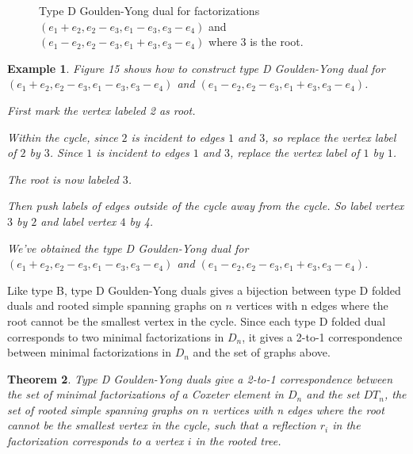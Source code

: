 \documentclass[11pt]{amsart}
\newtheorem{thm}{Theorem}[section]
\newtheorem{exa}[thm]{Example}%
\begin{document}
\begin{figure}
\caption{Type D Goulden-Yong dual for factorizations $(e_1+e_2,e_2-e_3,e_1-e_3,e_3-e_4)$ and $(e_1-e_2,e_2-e_3,e_1+e_3,e_3-e_4)$ where $3$ is the root.}
\end{figure}

\begin{exa}
    Figure 15 shows how to construct type D Goulden-Yong dual for $(e_1+e_2,e_2-e_3,e_1-e_3,e_3-e_4)$ and $(e_1-e_2,e_2-e_3,e_1+e_3,e_3-e_4)$.

    First mark the vertex labeled 2 as root.

    Within the cycle, since $2$ is incident to edges $1$ and $3$, so replace the vertex label of $2$ by $3$. Since $1$ is incident to edges $1$ and $3$, replace the vertex label of $1$ by $1$.

    The root is now labeled $3$.

    Then push labels of edges outside of the cycle away from the cycle. So label vertex $3$ by $2$ and label vertex $4$ by 4.

    We've obtained the type D Goulden-Yong dual for $(e_1+e_2,e_2-e_3,e_1-e_3,e_3-e_4)$ and $(e_1-e_2,e_2-e_3,e_1+e_3,e_3-e_4)$.
\end{exa}

Like type B, type D Goulden-Yong duals gives a bijection between type D folded duals and rooted simple spanning graphs on $n$ vertices with n edges where the root cannot be the smallest vertex in the cycle. Since each type D folded dual corresponds to two minimal factorizations in $D_n$, it gives a 2-to-1 correspondence between minimal factorizations in $D_n$ and the set of graphs above.

\begin{thm}\label{thm E}
    Type D Goulden-Yong duals give a 2-to-1 correspondence between the set of minimal factorizations of a Coxeter element in $D_n$ and the set $DT_n$, the set of  rooted simple spanning graphs on $n$ vertices with n edges where the root cannot be the smallest vertex in the cycle, such that a reflection $r_i$ in the factorization corresponds to a vertex $i$ in the rooted tree.
\end{thm}
\end{document}
